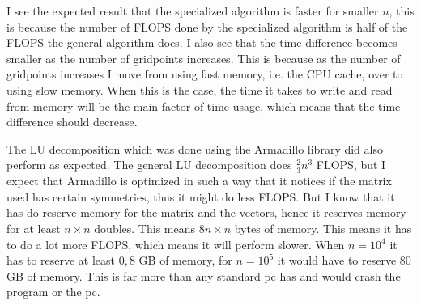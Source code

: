 \documentclass[12pt]{article}
\begin{document}
\centering
{}

\hfill\break

I see the expected result that the specialized algorithm is faster for smaller $n$, this is because the number of FLOPS done by the specialized algorithm is half of the FLOPS the general algorithm does. I also see that the time difference becomes smaller as the number of gridpoints increases. This is because as the number of gridpoints increases I move from using fast memory, i.e. the CPU cache, over to using slow memory. When this is the case, the time it takes to write and read from memory will be the main factor of time usage, which means that the time difference should decrease.
\hfill\break

The LU decomposition which was done using the Armadillo library did also perform as expected. The general LU decomposition does $\frac{2}{3}n^3$ FLOPS, but I expect that Armadillo is optimized in such a way that it notices if the matrix used has certain symmetries, thus it might do less FLOPS. But I know that it has do reserve memory for the matrix and the vectors, hence it reserves memory for at least $n\times n$ doubles. This means $8 n\times n$ bytes of memory. This means it has to do a lot more FLOPS, which means it will perform slower. When $n=10^4$ it has to reserve at least $0,8$ GB of memory, for $n=10^5$ it would have to reserve 80 GB of memory. This is far more than any standard pc has and would crash the program or the pc.
\hfill\break
\end{document}
